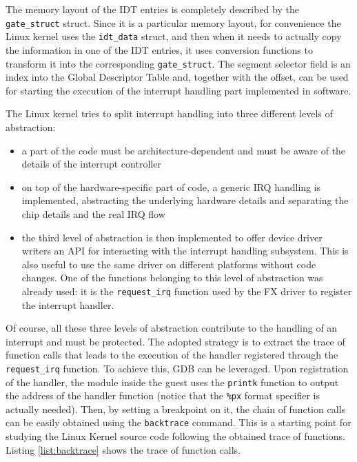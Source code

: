 The memory layout of the IDT entries is completely described by the \texttt{gate\_struct}  struct. Since it is a particular memory layout, for convenience the Linux kernel uses the \texttt{idt\_data} struct, and then when it needs to actually copy the information in one of the IDT entries, it uses conversion functions to transform it into the corresponding \texttt{gate\_struct}. The segment selector field is an index into the Global Descriptor Table and, together with the offset, can be used for starting the execution of the interrupt handling part implemented in software. 
\par
The Linux kernel tries to split interrupt handling into three different levels of abstraction:
\begin{itemize}
    \item a part of the code must be architecture-dependent and must be aware of the details of the interrupt controller
    \item on top of the hardware-specific part of code, a generic IRQ handling is implemented, abstracting the underlying hardware details and separating the chip details and the real IRQ flow
    \item the third level of abstraction is then implemented to offer device driver writers an API for interacting with the interrupt handling subsystem. This is also useful to use the same driver on different platforms without code changes. One of the functions belonging to this level of abstraction was already used: it is the \texttt{request\_irq} function used by the FX driver to register the interrupt handler.
\end{itemize}
Of course, all these three levels of abstraction contribute to the handling of an interrupt and must be protected. The adopted strategy is to extract the trace of function calls that leads to the execution of the handler registered through the \texttt{request\_irq} function. To achieve this, GDB can be leveraged. Upon registration of the handler, the module inside the guest uses the \texttt{printk} function to output the address of the handler function (notice that the \texttt{\%px} format specifier is actually needed). Then, by setting a breakpoint on it, the chain of function calls can be easily obtained using the \texttt{backtrace} command. This is a starting point for studying the Linux Kernel source code following the obtained trace of functions. Listing \ref{list:backtrace} shows the trace of function calls.

